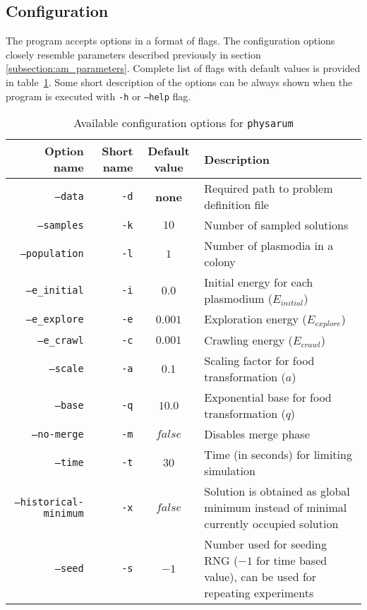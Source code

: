 \subsection{Configuration}

The program accepts options in a format of flags. The configuration options closely resemble parameters described previously in section \ref{subsection:am_parameters}. Complete list of flags with default values is provided in table~\ref{table:pi_options}. Some short description of the options can be always shown when the program is executed with \texttt{-h} or \texttt{--help} flag.

\begin{table}[h]
  \centering
  \caption{Available configuration options for \texttt{physarum}}
  \label{table:pi_options}
  \begin{tabularx}{\textwidth}{r|r|c|X}
    Option name & Short name & Default value & Description \\ \hline \hline
    \texttt{--data} & \texttt{-d} & \textbf{none} & Required path to problem definition file \\ \hline
    \texttt{--samples} & \texttt{-k} & $10$ & Number of sampled solutions \\ \hline
    \texttt{--population} & \texttt{-l} & $1$ & Number of plasmodia in a colony \\ \hline
    \texttt{--e\_initial} & \texttt{-i} & $0.0$ & Initial energy for each plasmodium ($E_{initial}$) \\ \hline
    \texttt{--e\_explore} & \texttt{-e} & $0.001$ & Exploration energy ($E_{explore}$) \\ \hline
    \texttt{--e\_crawl} & \texttt{-c} & $0.001$ & Crawling energy ($E_{crawl}$) \\ \hline
    \texttt{--scale} & \texttt{-a} & $0.1$ & Scaling factor for food transformation ($a$) \\ \hline
    \texttt{--base} & \texttt{-q} & $10.0$ & Exponential base for food transformation ($q$) \\ \hline
    \texttt{--no-merge} & \texttt{-m} & $false$ & Disables merge phase \\ \hline
    \texttt{--time} & \texttt{-t} & $30$ & Time (in seconds) for limiting simulation \\ \hline
    \texttt{--historical-minimum} & \texttt{-x} & $false$ & Solution is obtained as global minimum instead of minimal currently occupied solution \\ \hline
    \texttt{--seed} & \texttt{-s} & $-1$ & Number used for seeding RNG ($-1$ for time based value), can be used for repeating experiments \\ \hline \hline
  \end{tabularx}
\end{table}

